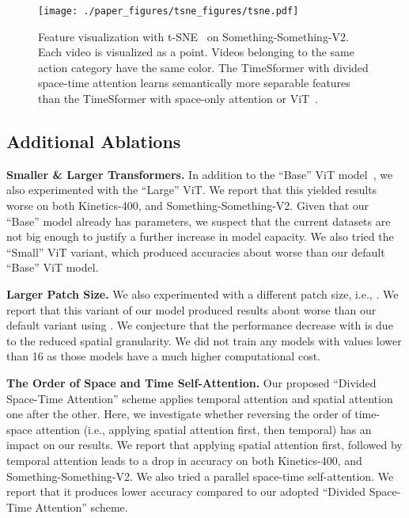 \documentclass{article}
\begin{document}
\begin{figure}
\begin{center}
   \texttt{[image: ./paper\_figures/tsne\_figures/tsne.pdf]}
\end{center}
\vspace{-0.4cm}
        \caption{Feature visualization with t-SNE~\cite{vanDerMaaten2008} on Something-Something-V2. Each video is visualized as a point. Videos belonging to the same action category have the same color. The TimeSformer with divided space-time attention learns semantically more separable features than the TimeSformer with space-only attention or ViT~\cite{Dosovitskiy:ICLR2021}. \vspace{-0.3cm}}
\label{tsne_fig}
\end{figure}



\subsection{Additional Ablations}

\textbf{Smaller \& Larger Transformers.} In addition to the ``Base'' ViT model~\cite{Dosovitskiy:ICLR2021}, we also experimented with the ``Large'' ViT. We report that this yielded results  worse on both Kinetics-400, and Something-Something-V2. Given that our ``Base'' model already has  parameters, we suspect that the current datasets are not big enough to justify a further increase in model capacity. We also tried  the ``Small'' ViT variant, which produced accuracies about  worse than our default ``Base'' ViT model.

\textbf{Larger Patch Size.} We also experimented with a different patch size, i.e., . We report that this variant of our model produced results about  worse  than our default variant using .
We conjecture that the performance decrease with  is due to the reduced spatial granularity.
 We did not train any models with  values lower than 16 as those models have a much higher computational cost.

\textbf{The Order of Space and Time Self-Attention.} Our proposed ``Divided Space-Time Attention'' scheme applies temporal attention and spatial attention one after the other. Here, we investigate whether reversing the order of time-space attention (i.e., applying spatial attention first, then temporal) has an impact on our results. We report that applying spatial attention first, followed by temporal attention leads to a  drop in accuracy on both Kinetics-400, and Something-Something-V2. We also tried a parallel space-time self-attention. We report that it produces  lower accuracy compared to our adopted ``Divided Space-Time Attention'' scheme.
\end{document}

